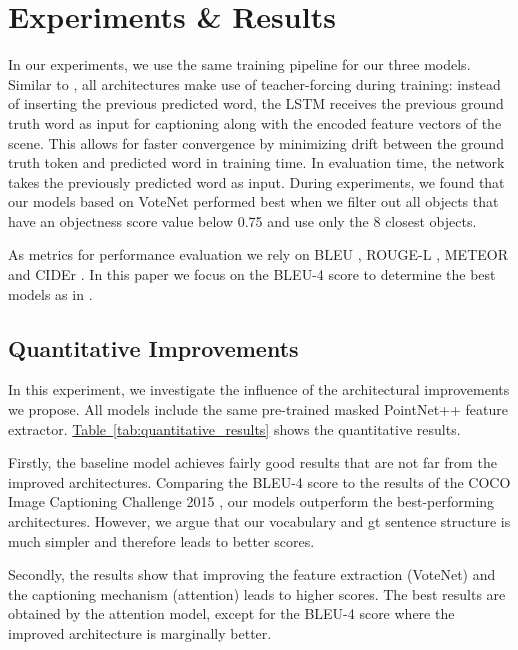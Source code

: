\documentclass[10pt,twocolumn,letterpaper]{article}
\begin{document}
\section{Experiments \& Results}

In our experiments, we use the same training pipeline for our three models. Similar to \cite{xu2015show}, all architectures make use of teacher-forcing during training: instead of inserting the previous predicted word, the LSTM receives the previous ground truth word as input for captioning along with the encoded feature vectors of the scene. This allows for faster convergence by minimizing drift between the ground truth token and predicted word in training time. In evaluation time, the network takes the previously predicted word as input. During experiments, we found that our models based on VoteNet performed best when we filter out all objects that have an objectness score value below 0.75 and use only the 8 closest objects.

As metrics for performance evaluation we rely on BLEU \cite{Papineni2002BleuAM}, ROUGE-L \cite{Lin2004ROUGEAP}, METEOR \cite{Denkowski2014MeteorUL} and CIDEr \cite{DBLP:journals/corr/VedantamZP14a}.  In this paper we focus on the BLEU-4 score to determine the best models as in \cite{xu2015show}. 

\subsection{Quantitative Improvements}
In this experiment, we investigate the influence of the architectural improvements we propose. All models include the same pre-trained masked PointNet++ feature extractor. 
\hyperref[tab:quantitative_results]{Table~\ref*{tab:quantitative_results}} shows the quantitative results. 

Firstly, the baseline model achieves fairly good results that are not far from the improved architectures. Comparing the BLEU-4 score to the results of the COCO Image Captioning Challenge 2015 \cite{COCO}, our models outperform the best-performing architectures. However, we argue that our vocabulary and gt sentence structure is much simpler and therefore leads to better scores.

Secondly, the results show that improving the feature extraction (VoteNet) and the captioning mechanism (attention) leads to higher scores. The best results are obtained by the attention model, except for the BLEU-4 score where the improved architecture is marginally better.                
\end{document}
